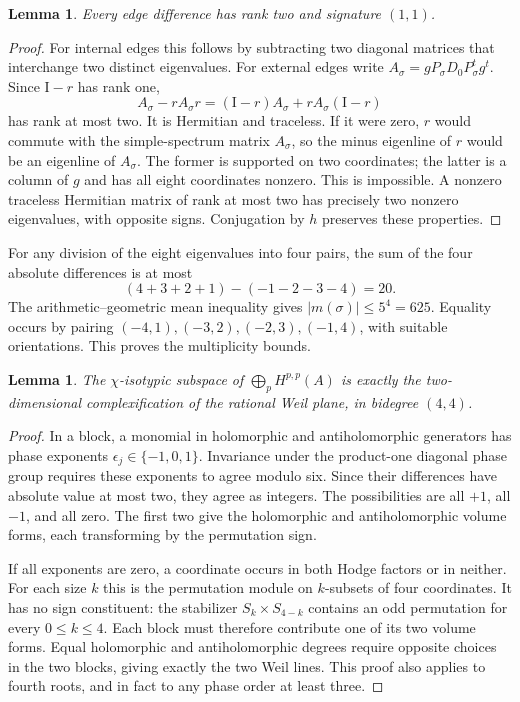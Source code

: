 \documentclass[11pt]{article}
\newtheorem{lemma}[theorem]{Lemma}
\theoremstyle{definition}
\theoremstyle{remark}
\newcommand{\Id}{\mathrm I}
\begin{document}
\begin{lemma}\label{eisenstein-trace-lem:signature}
Every edge difference has rank two and signature $(1,1)$.
\end{lemma}
\begin{proof}
For internal edges this follows by subtracting two diagonal matrices
that interchange two distinct eigenvalues.  For external edges write
$A_\sigma=gP_\sigma D_0P_\sigma^tg^t$.  Since $\Id-r$ has rank one,
\[
 A_\sigma-rA_\sigma r=(\Id-r)A_\sigma+rA_\sigma(\Id-r)
\]
has rank at most two.  It is Hermitian and traceless.  If it were zero,
$r$ would commute with the simple-spectrum matrix $A_\sigma$, so the
minus eigenline of $r$ would be an eigenline of $A_\sigma$.  The former
is supported on two coordinates; the latter is a column of $g$ and has
all eight coordinates nonzero.  This is impossible.  A nonzero
traceless Hermitian matrix of rank at most two has precisely two
nonzero eigenvalues, with opposite signs.  Conjugation by $h$ preserves
these properties.
\end{proof}

For any division of the eight eigenvalues into four pairs, the sum of
the four absolute differences is at most
\[
 (4+3+2+1)-(-1-2-3-4)=20.
\]
The arithmetic--geometric mean inequality gives $|m(\sigma)|\leq5^4=625$.
Equality occurs by pairing $(-4,1),(-3,2),(-2,3),(-1,4)$, with suitable
orientations.  This proves the multiplicity bounds.

\begin{lemma}\label{eisenstein-trace-lem:gate}
The $\chi$-isotypic subspace of $\bigoplus_pH^{p,p}(A)$ is exactly
the two-dimensional complexification of the rational Weil plane,
in bidegree $(4,4)$.
\end{lemma}
\begin{proof}
In a block, a monomial in holomorphic and antiholomorphic generators
has phase exponents $\epsilon_j\in\{-1,0,1\}$.  Invariance under the
product-one diagonal phase group requires these exponents to agree
modulo six.  Since their differences have absolute value at most two,
they agree as integers.  The possibilities are all $+1$, all $-1$,
and all zero.  The first two give the holomorphic and antiholomorphic
volume forms, each transforming by the permutation sign.

If all exponents are zero, a coordinate occurs in both Hodge factors
or in neither.  For each size $k$ this is the permutation module on
$k$-subsets of four coordinates.  It has no sign constituent: the
stabilizer $S_k\times S_{4-k}$ contains an odd permutation for every
$0\leq k\leq4$.  Each block must therefore contribute one of its two
volume forms.  Equal holomorphic and antiholomorphic degrees require
opposite choices in the two blocks, giving exactly the two Weil lines.
This proof also applies to fourth roots, and in fact to any phase
order at least three.
\end{proof}
\end{document}
